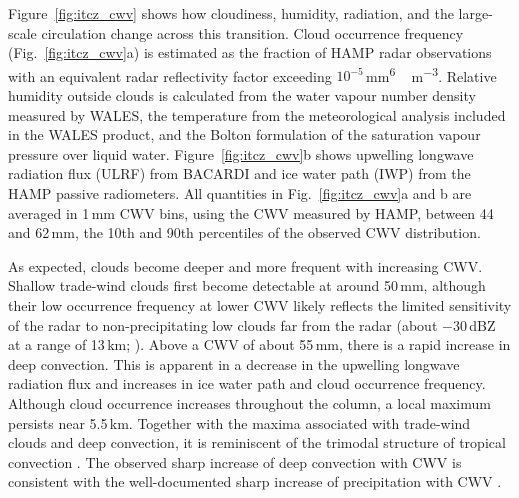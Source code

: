 \documentclass[acp, manuscript]{copernicus}
\begin{document}
Figure~\ref{fig:itcz_cwv} shows how cloudiness, humidity, radiation, and the large-scale circulation change across this transition. Cloud occurrence frequency (Fig.~\ref{fig:itcz_cwv}a) is estimated as the fraction of HAMP radar observations with an equivalent radar reflectivity factor exceeding $10^{-5}$\,\unit{mm^{6}\,m^{-3}}. Relative humidity outside clouds is calculated from the water vapour number density measured by WALES, the temperature from the meteorological analysis included in the WALES product, and the Bolton formulation of the saturation vapour pressure over liquid water. Figure~\ref{fig:itcz_cwv}b shows upwelling longwave radiation flux (ULRF) from BACARDI and ice water path (IWP) from the HAMP passive radiometers. 
All quantities in Fig.~\ref{fig:itcz_cwv}a and b are averaged in 1\,\unit{mm} CWV bins, using the CWV measured by HAMP, between 44 and 62\,\unit{mm}, the 10th and 90th percentiles of the observed CWV distribution.


As expected, clouds become deeper and more frequent with increasing CWV. Shallow trade-wind clouds first become detectable at around 50\,\unit{mm}, although their low occurrence frequency at lower CWV likely reflects the limited sensitivity of the radar to non-precipitating low clouds far from the radar (about $-30$\,\unit{dBZ} at a range of 13\,\unit{km}; \citealp{mechHAMPMicrowavePackage2014a}).
Above a CWV of about 55\,\unit{mm}, there is a rapid increase in deep convection. This is apparent in a decrease in the upwelling longwave radiation flux and increases in ice water path and cloud occurrence frequency.
Although cloud occurrence increases throughout the column, a local maximum persists near 5.5\,\unit{km}. Together with the maxima associated with trade-wind clouds and deep convection, it is reminiscent of the trimodal structure of tropical convection \citep{johnsonTrimodalCharacteristicsTropical1999}.
The observed sharp increase of deep convection with CWV is consistent with the well-documented sharp increase of precipitation with CWV \citep[e.g.,][]{Bretherton2004, Peters2006}.
\end{document}
